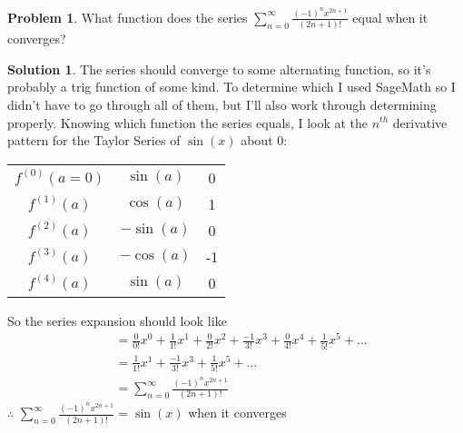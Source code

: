\documentclass[10pt]{article}
\theoremstyle{definition}
\newtheorem{problem}{Problem}
\newtheorem{soln}{Solution}
\begin{document}
\begin{problem}
What function does the series $\displaystyle \sum_{n = 0}^{\infty} \frac{(-1)^nx^{2n+1}}{(2n+1)!}$ equal when it converges?
\end{problem}
\begin{soln} The series should converge to some alternating function, so it's probably a trig function of some kind. To determine which I used SageMath so I didn't have to go through all of them,
      but I'll also work through determining properly. Knowing which function the series equals, I look at the $n^{th}$ derivative pattern for the Taylor Series of $\sin(x)$ about 0:
      \begin{center}
            \begin{tabular}{ c | c | c }
                  $f^{(0)}(a=0)$ & $\sin(a)$  & 0  \\
                  $f^{(1)}(a)$   & $\cos(a)$  & 1  \\
                  $f^{(2)}(a)$   & $-\sin(a)$ & 0  \\
                  $f^{(3)}(a)$   & $-\cos(a)$ & -1 \\
                  $f^{(4)}(a)$   & $\sin(a)$  & 0
            \end{tabular}
      \end{center}
      \noindent So the series expansion should look like
      \begin{align*}
             & = \frac{0}{0!}x^0+\frac{1}{1!}x^1+\frac{0}{2!}x^2+\frac{-1}{3!}x^3+\frac{0}{4!}x^4+\frac{1}{5!}x^5+\ldots \\
             & = \frac{1}{1!}x^1+\frac{-1}{3!}x^3+\frac{1}{5!}x^5+\ldots                                                 \\
             & = \sum_{n = 0}^{\infty} \frac{(-1)^nx^{2n+1}}{(2n+1)!}
      \end{align*}
      $\therefore$ $\displaystyle \sum_{n = 0}^{\infty} \frac{(-1)^nx^{2n+1}}{(2n+1)!}=\sin(x)$ when it converges
\end{soln}
\end{document}
